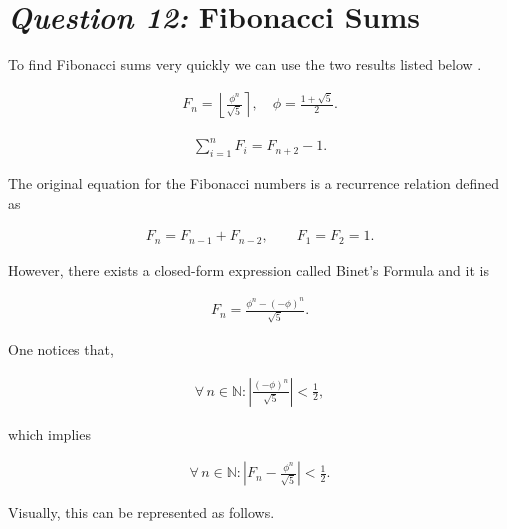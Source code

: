 \documentclass[12pt]{article}
\newcommand{\round}[1]{\left\lfloor #1 \right\rceil}
\newcommand{\abs}[1]{\left\lvert #1 \right\rvert}
\begin{document}




\section{\textit{Question 12:} Fibonacci Sums}

To find Fibonacci sums very quickly we can use the two results
listed below \cite{wikifib}.

\begin{align}
  F_n = \round{\frac{\phi^n}{\sqrt{5}}}, \quad \phi = \frac{1 +
  \sqrt{5}}{2}. \label{fib_num}
\end{align}

\begin{align}
  \sum_{i=1}^{n} F_i = F_{n+2} - 1. \label{fib_sum}
\end{align}

The original equation for the Fibonacci numbers is a recurrence
relation defined as

\begin{align}
  F_n = F_{n-1} + F_{n-2}, \qquad F_1 = F_2 = 1. \label{fib_def}
\end{align}

However, there exists a closed-form expression called Binet's
Formula \cite{wolframfib} and it is

\begin{align*}
  F_n = \frac{\phi^n - (-\phi)^n}{\sqrt{5}}.
\end{align*}

One notices that,

\begin{align*}
  \forall \, n \in \mathbb{N} : \abs{\frac{(-\phi)^n}{\sqrt{5}}}
  < \frac{1}{2},
\end{align*}

which implies

\begin{align*}
  \forall \, n \in \mathbb{N} : \abs{F_n -
  \frac{\phi^n}{\sqrt{5}}} < \frac{1}{2}.
\end{align*}

Visually, this can be represented as follows.

\begin{center}
\end{center}
\end{document}
